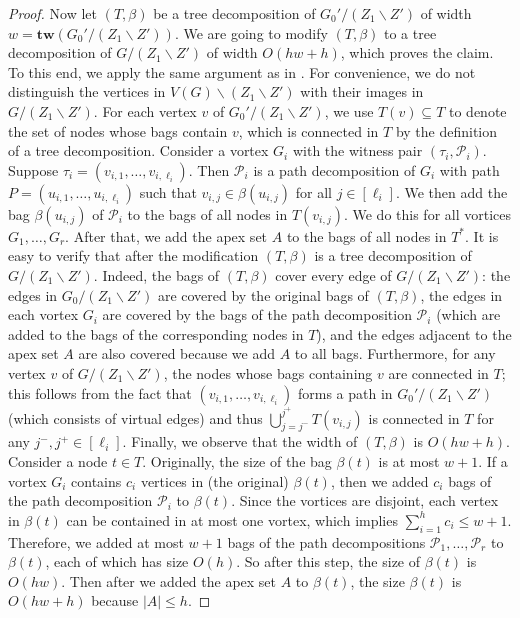 \documentclass[a4paper,11pt]{article}
\numberwithin{lemma}{section}
\newcommand{\tw}{\mathbf{tw}}
\begin{document}
\begin{proof}
Now let $(T,\beta)$ be a tree decomposition of $G_0'/(Z_1 \backslash Z')$ of width $w = \tw(G_0'/(Z_1 \backslash Z'))$.
We are going to modify $(T,\beta)$ to a tree decomposition of $G/(Z_1 \backslash Z')$ of width $O(hw + h)$, which proves the claim.
To this end, we apply the same argument as in \cite[Lemma 5.8]{DemaineFHT05}.
For convenience, we do not distinguish the vertices in $V(G) \backslash (Z_1 \backslash Z')$ with their images in $G/(Z_1 \backslash Z')$.
For each vertex $v$ of $G_0'/(Z_1 \backslash Z')$, we use $T(v) \subseteq T$ to denote the set of nodes whose bags contain $v$, which is connected in $T$ by the definition of a tree decomposition.
Consider a vortex $G_i$ with the witness pair $(\tau_i,\mathcal{P}_i)$.
Suppose $\tau_i = (v_{i,1},\dots,v_{i,\ell_i})$.
Then $\mathcal{P}_i$ is a path decomposition of $G_i$ with path $P = (u_{i,1},\dots,u_{i,\ell_i})$ such that $v_{i,j} \in \beta(u_{i,j})$ for all $j \in [\ell_i]$.
We then add the bag $\beta(u_{i,j})$ of $\mathcal{P}_i$ to the bags of all nodes in $T(v_{i,j})$.
We do this for all vortices $G_1,\dots,G_r$.
After that, we add the apex set $A$ to the bags of all nodes in $T^*$.
It is easy to verify that after the modification $(T,\beta)$ is a tree decomposition of $G/(Z_1 \backslash Z')$.
Indeed, the bags of $(T,\beta)$ cover every edge of $G/(Z_1 \backslash Z')$: the edges in $G_0/(Z_1 \backslash Z')$ are covered by the original bags of $(T,\beta)$, the edges in each vortex $G_i$ are covered by the bags of the path decomposition $\mathcal{P}_i$ (which are added to the bags of the corresponding nodes in $T$), and the edges adjacent to the apex set $A$ are also covered because we add $A$ to all bags.
Furthermore, for any vertex $v$ of $G/(Z_1 \backslash Z')$, the nodes whose bags containing $v$ are connected in $T$; this follows from the fact that $(v_{i,1},\dots,v_{i,\ell_i})$ forms a path in $G_0'/(Z_1 \backslash Z')$ (which consists of virtual edges) and thus $\bigcup_{j=j^-}^{j^+} T(v_{i,j})$ is connected in $T$ for any $j^-,j^+ \in [\ell_i]$.
Finally, we observe that the width of $(T,\beta)$ is $O(hw+h)$.
Consider a node $t \in T$.
Originally, the size of the bag $\beta(t)$ is at most $w+1$.
If a vortex $G_i$ contains $c_i$ vertices in (the original) $\beta(t)$, then we added $c_i$ bags of the path decomposition $\mathcal{P}_i$ to $\beta(t)$.
Since the vortices are disjoint, each vertex in $\beta(t)$ can be contained in at most one vortex, which implies $\sum_{i=1}^h c_i \leq w+1$.
Therefore, we added at most $w+1$ bags of the path decompositions $\mathcal{P}_1,\dots,\mathcal{P}_r$ to $\beta(t)$, each of which has size $O(h)$.
So after this step, the size of $\beta(t)$ is $O(hw)$.
Then after we added the apex set $A$ to $\beta(t)$, the size $\beta(t)$ is $O(hw+h)$ because $|A| \leq h$.
\end{proof}
\end{document}
